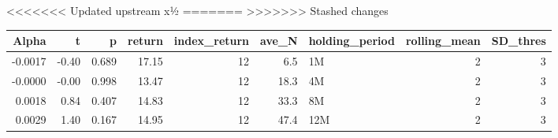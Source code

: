<<<<<<< Updated upstream
x½%
=======
>>>>>>> Stashed changes
\begin{table}[ht]
\centering
\begin{tabular}{rrrrrrlrr}
  \hline
Alpha & t & p & return & index\_return & ave\_N & holding\_period & rolling\_mean & SD\_thres \\ 
  \hline
-0.0017 & -0.40 & 0.689 & 17.15 & 12 & 6.5 & 1M &  2 &  3 \\ 
  -0.0000 & -0.00 & 0.998 & 13.47 & 12 & 18.3 & 4M &  2 &  3 \\ 
  0.0018 & 0.84 & 0.407 & 14.83 & 12 & 33.3 & 8M &  2 &  3 \\ 
  0.0029 & 1.40 & 0.167 & 14.95 & 12 & 47.4 & 12M &  2 &  3 \\ 
   \hline
\end{tabular}
\end{table}

